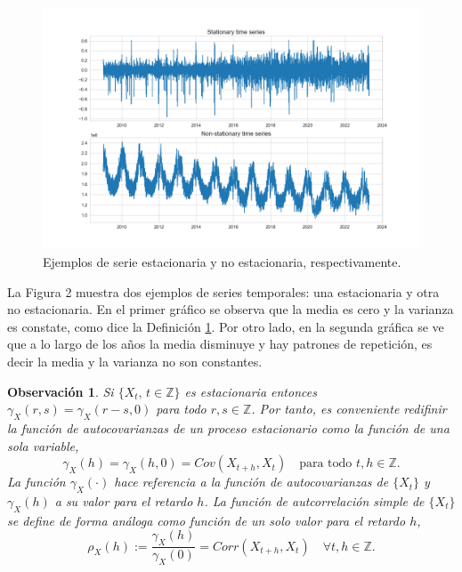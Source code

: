 \documentclass[12pt,twoside]{article}
\newtheorem{remark}[theorem]{Observación}
\begin{document}
\begin{figure}
\includegraphics[width = \textwidth]{imagenes/Stationarity.png}
\caption{Ejemplos de serie estacionaria y no estacionaria, respectivamente.}\label{fig:Stationarity}
\end{figure}

La Figura 2 muestra dos ejemplos de series temporales: una estacionaria y otra no estacionaria. En el primer gráfico se observa que la media es cero y la varianza es constate, como dice la Definición \ref{fig:Stationarity}. Por otro lado, en la segunda gráfica se ve que a lo largo de los años la media disminuye y hay patrones de repetición, es decir la media y la varianza no son constantes.


\begin{remark}
    Si $\{X_t, \,t \in \mathbb{Z}\}$ es estacionaria entonces $\gamma_X(r,s) = \gamma_X(r-s,0)$ para todo $r,s \in \mathbb{Z}$. Por tanto, es conveniente redifinir la función de autocovarianzas de un proceso estacionario como la función de una sola variable,
    \begin{equation*}
        \gamma_X(h) = \gamma_X(h,0) = Cov(X_{t+h}, X_t) \quad \text{para todo } t,h \in \mathbb{Z}.
    \end{equation*}
La función $\gamma_X(\cdot)$ hace referencia a la función de autocovarianzas de $\{X_t\}$ y $\gamma_X(h)$ a su valor para el retardo $h$. La función de autcorrelación simple de $\{X_t\}$ se define de forma análoga como función de un solo valor para el retardo $h$,
\begin{equation*}
    \rho_X(h) := \frac{\gamma_X(h)}{\gamma_X(0)} = Corr(X_{t+h}, X_t) \quad \forall t,h \in \mathbb{Z}.
\end{equation*}
\end{remark}
\end{document}
